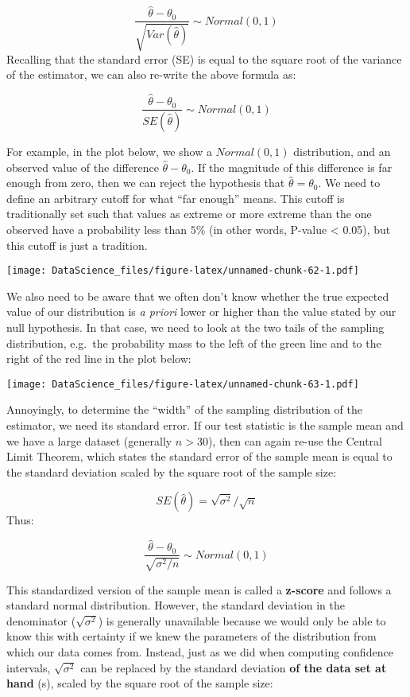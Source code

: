 \documentclass[
]{book}
\begin{document}
\[\frac{\hat{\theta} - \theta_0}{\sqrt{Var(\hat{\theta})}} \sim Normal(0, 1)\]
Recalling that the standard error (SE) is equal to the square root of the variance of the estimator, we can also re-write the above formula as:

\[\frac{\hat{\theta} - \theta_0}{SE(\hat{\theta})} \sim Normal(0, 1)\]

For example, in the plot below, we show a \(Normal(0,1)\) distribution, and an observed value of the difference \(\hat{\theta}-\theta_0\). If the magnitude of this difference is far enough from zero, then we can reject the hypothesis that \(\hat{\theta} = \theta_0\). We need to define an arbitrary cutoff for what ``far enough'' means. This cutoff is traditionally set such that values as extreme or more extreme than the one observed have a probability less than \(5\%\) (in other words, P-value \textless{} 0.05), but this cutoff is just a tradition.

\texttt{[image: DataScience\_files/figure-latex/unnamed-chunk-62-1.pdf]}

We also need to be aware that we often don't know whether the true expected value of our distribution is \emph{a priori} lower or higher than the value stated by our null hypothesis. In that case, we need to look at the two tails of the sampling distribution, e.g.~the probability mass to the left of the green line and to the right of the red line in the plot below:

\texttt{[image: DataScience\_files/figure-latex/unnamed-chunk-63-1.pdf]}

Annoyingly, to determine the ``width'' of the sampling distribution of the estimator, we need its standard error. If our test statistic is the sample mean and we have a large dataset (generally \(n>30\)), then can again re-use the Central Limit Theorem, which states the standard error of the sample mean is equal to the standard deviation scaled by the square root of the sample size:

\[SE(\hat{\theta}) = \sqrt{\sigma^2}/\sqrt{n}\]
Thus:

\[\frac{\hat{\theta} - \theta_0}{\sqrt{\sigma^2/n}} \sim Normal(0, 1)\]

This standardized version of the sample mean is called a \textbf{z-score} and follows a standard normal distribution. However, the standard deviation in the denominator (\(\sqrt{\sigma^2}\)) is generally unavailable because we would only be able to know this with certainty if we knew the parameters of the distribution from which our data comes from. Instead, just as we did when computing confidence intervals, \(\sqrt{\sigma^2}\) can be replaced by the standard deviation \textbf{of the data set at hand} (s), scaled by the square root of the sample size:
\end{document}
